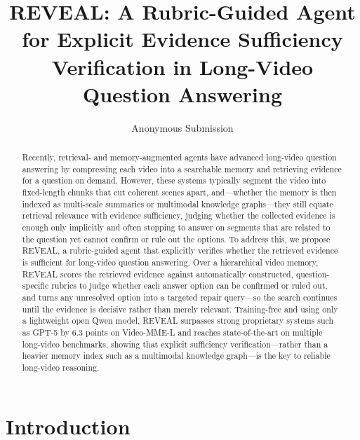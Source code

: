 \documentclass[letterpaper]{article} %
\title{REVEAL: A Rubric-Guided Agent for Explicit Evidence Sufficiency Verification in Long-Video Question Answering}
\author{Anonymous Submission}
\begin{document}
\maketitle

\begin{abstract}
Recently, retrieval- and memory-augmented agents have advanced long-video question answering by compressing each video into a searchable memory and retrieving evidence for a question on demand. However, these systems typically segment the video into fixed-length chunks that cut coherent scenes apart, and---whether the memory is then indexed as multi-scale summaries or multimodal knowledge graphs---they still equate retrieval relevance with evidence sufficiency, judging whether the collected evidence is enough only implicitly and often stopping to answer on segments that are related to the question yet cannot confirm or rule out the options. To address this, we propose REVEAL, a rubric-guided agent that explicitly verifies whether the retrieved evidence is sufficient for long-video question answering. Over a hierarchical video memory, REVEAL scores the retrieved evidence against automatically constructed, question-specific rubrics to judge whether each answer option can be confirmed or ruled out, and turns any unresolved option into a targeted repair query---so the search continues until the evidence is decisive rather than merely relevant. Training-free and using only a lightweight open Qwen model, REVEAL surpasses strong proprietary systems such as GPT-5 by 6.3 points on Video-MME-L and reaches state-of-the-art on multiple long-video benchmarks, showing that explicit sufficiency verification---rather than a heavier memory index such as a multimodal knowledge graph---is the key to reliable long-video reasoning.
\end{abstract}


\section{Introduction}
\end{document}

